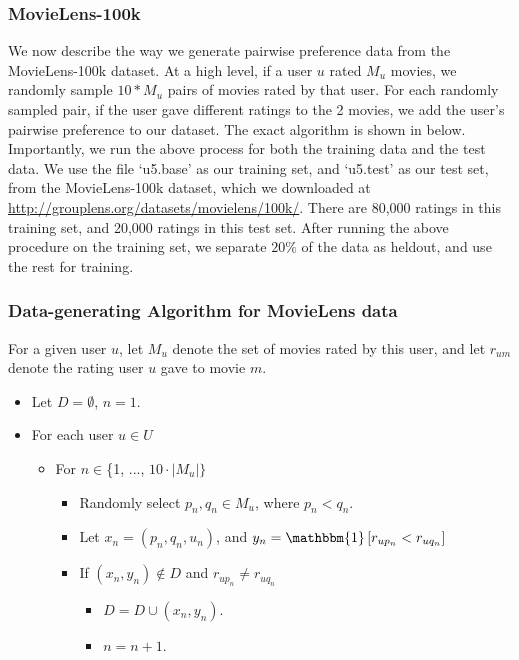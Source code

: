\subsubsection{MovieLens-100k}
We now describe the way we generate pairwise preference data from the 
MovieLens-100k dataset.  At a high level, if a user $u$ rated $M_u$ movies,
we randomly sample $10*M_u$ pairs of movies rated by that user.  For each
randomly sampled pair, if the user gave different ratings to the 2 movies,
we add the user's pairwise preference to our dataset.  The exact algorithm
is shown in below.
Importantly, we run the above process for both the training data and the test
data.  We use the file `u5.base' as our training set, and `u5.test' as our test
set, from the MovieLens-100k dataset, which we downloaded at 
\url{http://grouplens.org/datasets/movielens/100k/}.  
There are 80,000 ratings in this training
set, and 20,000 ratings in this test set.
After running the above procedure on the training set, we separate $20\%$ of the
data as heldout, and use the rest for training.

\subsubsection{Data-generating Algorithm for MovieLens data}

For a given user $u$, let $M_u$ denote the set of movies rated by this user, and let
$r_{um}$ denote the rating user $u$ gave to movie $m$.

\begin{itemize}
	\item Let $D = \emptyset$, $n = 1$.
	\item For each user $u \in U$
	\begin{itemize}
		\item For $n \in $\{1, ..., $10\cdot|M_u|\}$
		\begin{itemize}
			\item Randomly select $p_n, q_n \in M_u$, where $p_n < q_n$.
			\item Let $x_n = (p_n, q_n, u_n)$, and $y_n = \mathbbm{1}  \left[r_{up_n} < r_{uq_n} \right]$
			\item If $(x_n,y_n) \notin D$ and $r_{up_n} \neq r_{uq_n}$
			\begin{itemize}
				\item $D = D \cup (x_n,y_n)$.
				\item $n=n+1$.
			\end{itemize}
		\end{itemize}
	\end{itemize}
\end{itemize}

